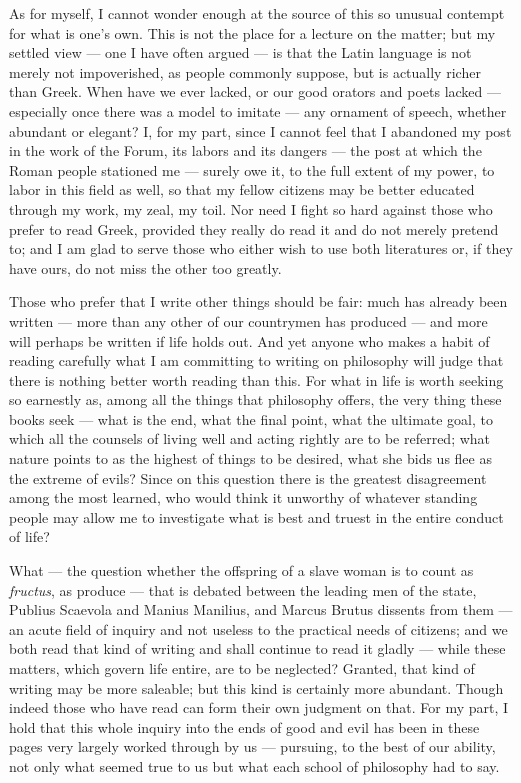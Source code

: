  As for myself, I cannot wonder enough at the source of this so unusual contempt for what is one's own. This is not the place for a lecture on the matter; but my settled view — one I have often argued — is that the Latin language is not merely not impoverished, as people commonly suppose, but is actually richer than Greek. When have we ever lacked, or our good orators and poets lacked — especially once there was a model to imitate — any ornament of speech, whether abundant or elegant? I, for my part, since I cannot feel that I abandoned my post in the work of the Forum, its labors and its dangers — the post at which the Roman people stationed me — surely owe it, to the full extent of my power, to labor in this field as well, so that my fellow citizens may be better educated through my work, my zeal, my toil. Nor need I fight so hard against those who prefer to read Greek, provided they really do read it and do not merely pretend to; and I am glad to serve those who either wish to use both literatures or, if they have ours, do not miss the other too greatly.

 Those who prefer that I write other things should be fair: much has already been written — more than any other of our countrymen has produced — and more will perhaps be written if life holds out. And yet anyone who makes a habit of reading carefully what I am committing to writing on philosophy will judge that there is nothing better worth reading than this. For what in life is worth seeking so earnestly as, among all the things that philosophy offers, the very thing these books seek — what is the end, what the final point, what the ultimate goal, to which all the counsels of living well and acting rightly are to be referred; what nature points to as the highest of things to be desired, what she bids us flee as the extreme of evils? Since on this question there is the greatest disagreement among the most learned, who would think it unworthy of whatever standing people may allow me to investigate what is best and truest in the entire conduct of life?

 What — the question whether the offspring of a slave woman is to count as \textit{fructus}, as produce — that is debated between the leading men of the state, Publius Scaevola and Manius Manilius, and Marcus Brutus dissents from them — an acute field of inquiry and not useless to the practical needs of citizens; and we both read that kind of writing and shall continue to read it gladly — while these matters, which govern life entire, are to be neglected? Granted, that kind of writing may be more saleable; but this kind is certainly more abundant. Though indeed those who have read can form their own judgment on that. For my part, I hold that this whole inquiry into the ends of good and evil has been in these pages very largely worked through by us — pursuing, to the best of our ability, not only what seemed true to us but what each school of philosophy had to say.

